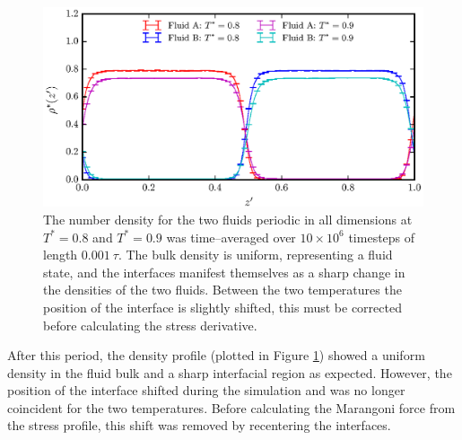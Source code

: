 \begin{figure}[h!]
\centering
\includegraphics[scale=1.0]{Period10Rho}
\caption{The number density for the two fluids periodic in all dimensions at $T^{*} = 0.8$ and $T^{*} = 0.9$ was time--averaged over $10 \times 10^{6}$ timesteps of length $0.001\ \tau$. 
The bulk density is uniform, representing a fluid state, and the interfaces manifest themselves as a sharp change in the densities of the two fluids.
Between the two temperatures the position of the interface is slightly shifted, this must be corrected before calculating the stress derivative.
}
\label{Period10Rho}
\end{figure}
After this period, the density profile (plotted in Figure \ref{Period10Rho}) showed a uniform density in the fluid bulk and a sharp interfacial region as expected.
However, the position of the interface shifted during the simulation and was no longer coincident for the two temperatures.
Before calculating the Marangoni force from the stress profile, this shift was removed by recentering the interfaces.
\FloatBarrier

